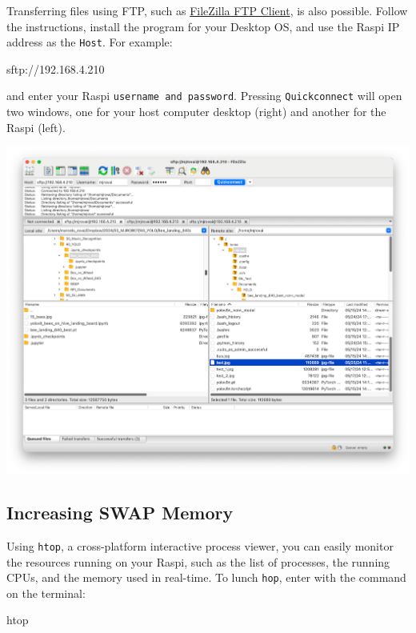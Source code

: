 \documentclass[
]{article}
\newenvironment{Shaded}{\begin{snugshade}}{\end{snugshade}}
\newcommand{\ExtensionTok}[1]{\textcolor[rgb]{0.00,0.23,0.31}{#1}}
\begin{document}
Transferring files using FTP, such as
\href{https://filezilla-project.org/download.php?type=client}{FileZilla
FTP Client}, is also possible. Follow the instructions, install the
program for your Desktop OS, and use the Raspi IP address as the
\texttt{Host}. For example:

\begin{Shaded}
\begin{Highlighting}[]
\ExtensionTok{sftp://192.168.4.210}
\end{Highlighting}
\end{Shaded}

\noindent and enter your Raspi \texttt{username\ and\ password}.
Pressing \texttt{Quickconnect} will open two windows, one for your host
computer desktop (right) and another for the Raspi (left).

\noindent \begin{center}
\includegraphics[width=0.8\linewidth,height=\textheight,keepaspectratio]{images/png/filezila.png}
\end{center}

\subsection{Increasing SWAP
Memory}\label{sec-setup-increasing-swap-memory-d591}

Using \texttt{htop}, a cross-platform interactive process viewer, you
can easily monitor the resources running on your Raspi, such as the list
of processes, the running CPUs, and the memory used in real-time. To
lunch \texttt{hop}, enter with the command on the terminal:

\begin{Shaded}
\begin{Highlighting}[]
\ExtensionTok{htop}
\end{Highlighting}
\end{Shaded}
\end{document}
